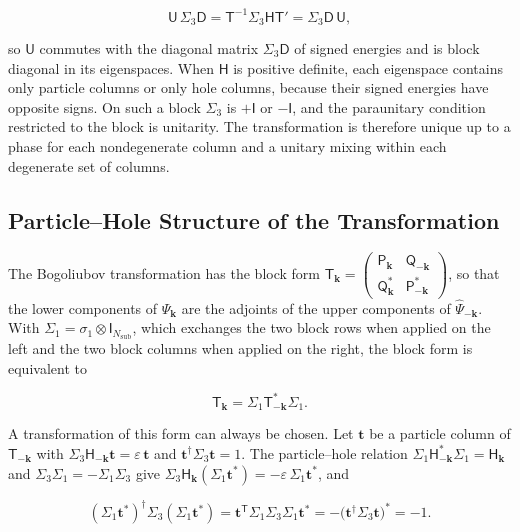 \[
\mathsf U\,\Sigma_3\mathsf D=\mathsf T^{-1}\Sigma_3\mathsf H\mathsf T'=\Sigma_3\mathsf D\,\mathsf U,
\]

so \(\mathsf U\) commutes with the diagonal matrix \(\Sigma_3\mathsf D\) of signed energies and is block diagonal in its eigenspaces. When \(\mathsf H\) is positive definite, each eigenspace contains only particle columns or only hole columns, because their signed energies have opposite signs. On such a block \(\Sigma_3\) is \(+\mathsf I\) or \(-\mathsf I\), and the paraunitary condition restricted to the block is unitarity. The transformation is therefore unique up to a phase for each nondegenerate column and a unitary mixing within each degenerate set of columns.

\subsection{Particle--Hole Structure of the Transformation}

The Bogoliubov transformation has the block form \(\mathsf T_{\mathbf k}=\begin{pmatrix}\mathsf P_{\mathbf k}&\mathsf Q_{-\mathbf k}\\ \mathsf Q_{\mathbf k}^*&\mathsf P_{-\mathbf k}^*\end{pmatrix}\), so that the lower components of \(\hat\Psi_{\mathbf k}\) are the adjoints of the upper components of \(\hat\Psi_{-\mathbf k}\). With \(\Sigma_1=\sigma_1\otimes\mathsf I_{N_{\mathrm{sub}}}\), which exchanges the two block rows when applied on the left and the two block columns when applied on the right, the block form is equivalent to

\begin{equation}\label{eq-lswt-transformation-particle-hole}
\mathsf T_{\mathbf k}=\Sigma_1\mathsf T_{-\mathbf k}^*\Sigma_1.
\end{equation}

A transformation of this form can always be chosen. Let \(\mathbf t\) be a particle column of \(\mathsf T_{-\mathbf k}\) with \(\Sigma_3\mathsf H_{-\mathbf k}\mathbf t=\varepsilon\,\mathbf t\) and \(\mathbf t^\dagger\Sigma_3\mathbf t=1\). The particle--hole relation \(\Sigma_1\mathsf H_{-\mathbf k}^*\Sigma_1=\mathsf H_{\mathbf k}\) and \(\Sigma_3\Sigma_1=-\Sigma_1\Sigma_3\) give \(\Sigma_3\mathsf H_{\mathbf k}(\Sigma_1\mathbf t^*)=-\varepsilon\,\Sigma_1\mathbf t^*\), and

\[
(\Sigma_1\mathbf t^*)^\dagger\Sigma_3(\Sigma_1\mathbf t^*)=\mathbf t^{\mathsf T}\Sigma_1\Sigma_3\Sigma_1\mathbf t^*=-\big(\mathbf t^\dagger\Sigma_3\mathbf t\big)^*=-1.
\]

